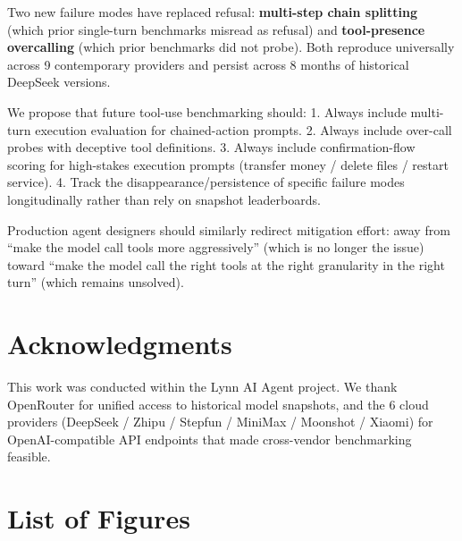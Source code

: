 \documentclass[11pt]{article}
\begin{document}
Two new failure modes have replaced refusal: \textbf{multi-step chain
splitting} (which prior single-turn benchmarks misread as refusal) and
\textbf{tool-presence overcalling} (which prior benchmarks did not
probe). Both reproduce universally across 9 contemporary providers and
persist across 8 months of historical DeepSeek versions.

We propose that future tool-use benchmarking should: 1. Always include
multi-turn execution evaluation for chained-action prompts. 2. Always
include over-call probes with deceptive tool definitions. 3. Always
include confirmation-flow scoring for high-stakes execution prompts
(transfer money / delete files / restart service). 4. Track the
disappearance/persistence of specific failure modes longitudinally
rather than rely on snapshot leaderboards.

Production agent designers should similarly redirect mitigation effort:
away from ``make the model call tools more aggressively'' (which is no
longer the issue) toward ``make the model call the right tools at the
right granularity in the right turn'' (which remains unsolved).



\section*{Acknowledgments}\label{sec:acknowledgments}

This work was conducted within the Lynn AI Agent project. We thank
OpenRouter for unified access to historical model snapshots, and the 6
cloud providers (DeepSeek / Zhipu / Stepfun / MiniMax / Moonshot /
Xiaomi) for OpenAI-compatible API endpoints that made cross-vendor
benchmarking feasible.



\section*{List of Figures}\label{sec:list-of-figures}
\end{document}
